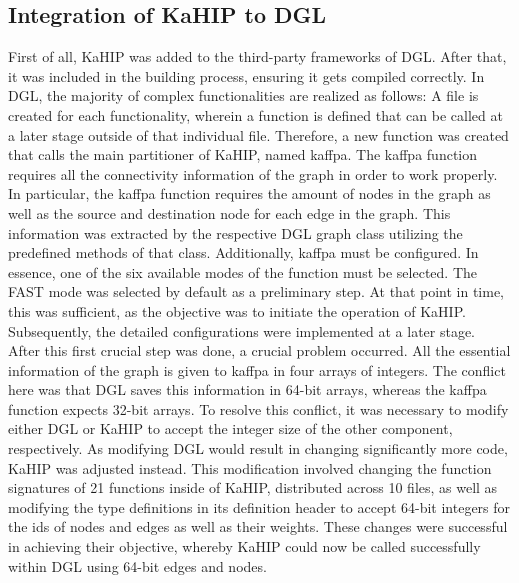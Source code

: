 \documentclass[acmsmall,nonacm,screen,review]{acmart}
\begin{document}
\subsection{Integration of KaHIP to DGL}
First of all, KaHIP was added to the third-party frameworks of DGL. After that, it was included in the building process, ensuring it gets compiled correctly. In DGL, the majority of complex functionalities are realized as follows: A file is created for each functionality, wherein a function is defined that can be called at a later stage outside of that individual file. Therefore, a new function was created that calls the main partitioner of KaHIP, named kaffpa. The kaffpa function requires all the connectivity information of the graph in order to work properly. In particular, the kaffpa function requires the amount of nodes in the graph as well as the source and destination node for each edge in the graph. This information was extracted by the respective DGL graph class utilizing the predefined methods of that class. Additionally, kaffpa must be configured. In essence, one of the six available modes of the function must be selected. The FAST mode was selected by default as a preliminary step. At that point in time, this was sufficient, as the objective was to initiate the operation of KaHIP. Subsequently, the detailed configurations were implemented at a later stage.\\
After this first crucial step was done, a crucial problem occurred. All the essential information of the graph is given to kaffpa in four arrays of integers. The conflict here was that DGL saves this information in 64-bit arrays, whereas the kaffpa function expects 32-bit arrays. To resolve this conflict, it was necessary to modify either DGL or KaHIP to accept the integer size of the other component, respectively. As modifying DGL would result in changing significantly more code, KaHIP was adjusted instead. This modification involved changing the function signatures of 21 functions inside of KaHIP, distributed across 10 files, as well as modifying the type definitions in its definition header to accept 64-bit integers for the ids of nodes and edges as well as their weights. These changes were successful in achieving their objective, whereby KaHIP could now be called successfully within DGL using 64-bit edges and nodes. \\
\end{document}
